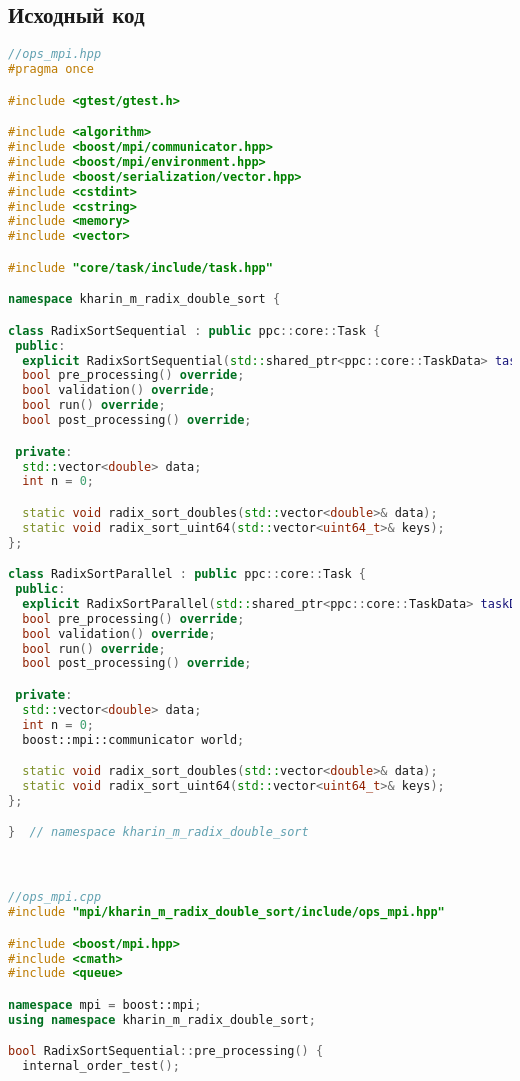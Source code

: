 \documentclass[a4paper,12pt]{article}
\begin{document}
\subsection{Исходный код}
\begin{lstlisting}[language=C++, caption={Реализация}]
//ops_mpi.hpp
#pragma once

#include <gtest/gtest.h>

#include <algorithm>
#include <boost/mpi/communicator.hpp>
#include <boost/mpi/environment.hpp>
#include <boost/serialization/vector.hpp>
#include <cstdint>
#include <cstring>
#include <memory>
#include <vector>

#include "core/task/include/task.hpp"

namespace kharin_m_radix_double_sort {

class RadixSortSequential : public ppc::core::Task {
 public:
  explicit RadixSortSequential(std::shared_ptr<ppc::core::TaskData> taskData_) : Task(std::move(taskData_)) {}
  bool pre_processing() override;
  bool validation() override;
  bool run() override;
  bool post_processing() override;

 private:
  std::vector<double> data;
  int n = 0;

  static void radix_sort_doubles(std::vector<double>& data);
  static void radix_sort_uint64(std::vector<uint64_t>& keys);
};

class RadixSortParallel : public ppc::core::Task {
 public:
  explicit RadixSortParallel(std::shared_ptr<ppc::core::TaskData> taskData_) : Task(std::move(taskData_)) {}
  bool pre_processing() override;
  bool validation() override;
  bool run() override;
  bool post_processing() override;

 private:
  std::vector<double> data;
  int n = 0;
  boost::mpi::communicator world;

  static void radix_sort_doubles(std::vector<double>& data);
  static void radix_sort_uint64(std::vector<uint64_t>& keys);
};

}  // namespace kharin_m_radix_double_sort



//ops_mpi.cpp
#include "mpi/kharin_m_radix_double_sort/include/ops_mpi.hpp"

#include <boost/mpi.hpp>
#include <cmath>
#include <queue>

namespace mpi = boost::mpi;
using namespace kharin_m_radix_double_sort;

bool RadixSortSequential::pre_processing() {
  internal_order_test();


\end{lstlisting}
\end{document}
